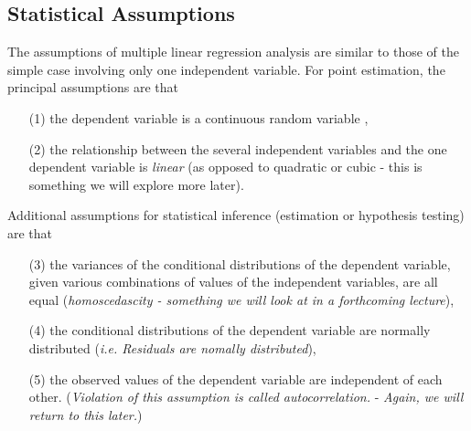 \documentclass[a4paper,12pt]{article}
\begin{document}
\subsection{Statistical Assumptions}
The assumptions of multiple linear regression analysis are similar to those of the simple case involving only one independent variable. For point estimation, the principal assumptions are that


\begin{itemize}
\item[(1)] the dependent variable is a continuous random variable ,
\item[(2)] the relationship between the several independent variables and the one dependent variable is \textit{linear} (as opposed to quadratic or cubic - this is something we will explore more later).
\end{itemize}

\noindent Additional assumptions for statistical inference (estimation or hypothesis testing) are that
\begin{itemize}
\item[(3)] the variances of the conditional distributions of the dependent variable, given various combinations of values of the independent variables, are all equal (\textit{homoscedascity - something we will look at in a forthcoming lecture}),
\item[(4)] the conditional distributions of the dependent variable
are normally distributed (\textit{i.e. Residuals are nomally distributed}),
\item[(5)] the observed values of the dependent variable are independent of each other. (\textit{Violation of this assumption is called autocorrelation.} - \textit{Again, we will return to this later.})
\end{itemize}
%
%
\end{document}
